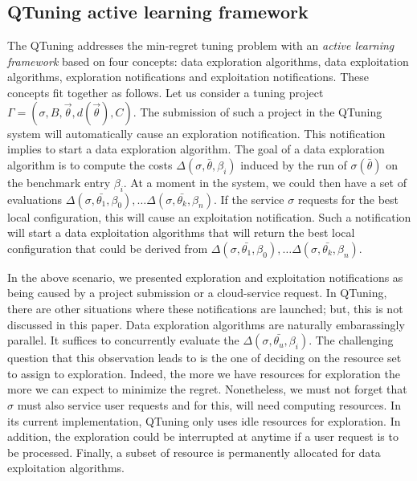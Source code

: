 \documentclass[10pt, conference, compsocconf]{IEEEtran}
\begin{document}
\subsection{QTuning active learning framework} 

The QTuning addresses the min-regret tuning problem with an {\it active learning framework} 
based on four concepts: data exploration algorithms, data exploitation algorithms, 
exploration notifications and exploitation notifications. These concepts fit together as follows. Let us consider 
a tuning project  $\Gamma = (\sigma, B, \vec{\theta}, d(\vec{\theta}), C)$. The submission of such a project 
in the QTuning system will automatically cause an exploration notification. This notification implies 
to start a data exploration algorithm. The goal of a data exploration algorithm is to  
compute the costs $\Delta(\sigma, \bar{\theta}, \beta_i)$  induced by the run of  $\sigma(\bar{\theta})$ on the benchmark 
entry $\beta_i$.  At a moment in the system, we could then have a set of evaluations 
$\Delta(\sigma, \bar{\theta_1}, \beta_0), \dots \Delta(\sigma, \bar{\theta_k}, \beta_n)$. If the service $\sigma$ 
 requests for the best local configuration, this will cause an exploitation notification. Such a notification will 
start a data exploitation algorithms that will return the best local configuration that could be derived from 
$\Delta(\sigma, \bar{\theta_1}, \beta_0), \dots \Delta(\sigma, \bar{\theta_k}, \beta_n)$.

In the above scenario, we presented exploration and exploitation notifications as being caused by a project submission or a cloud-service 
request. In QTuning, there are other situations where these notifications are launched; but, this is not discussed in this paper.
Data exploration algorithms are naturally embarassingly parallel. It suffices to concurrently evaluate 
the $\Delta(\sigma, \bar{\theta_u}, \beta_i)$. The challenging question that this observation leads to is the 
one of deciding on the resource set to assign to  exploration. Indeed, the more we have resources for exploration 
the more we can expect to minimize the regret. Nonetheless, we must not forget that $\sigma$ must also service 
user requests and for this, will need computing resources. In its current implementation, QTuning only uses 
idle resources for exploration. In addition, the exploration could be interrupted at anytime if a user 
request is to be processed. Finally, a subset of resource is permanently allocated for data exploitation algorithms. 
\end{document}
